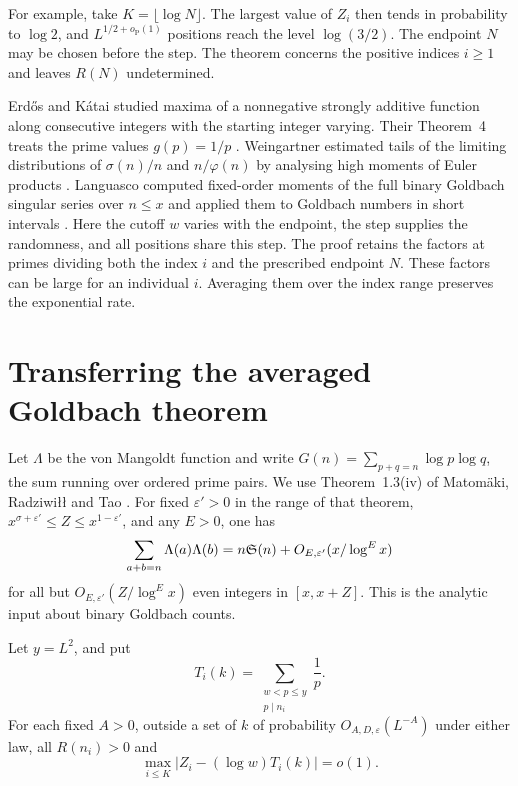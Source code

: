 For example, take \(K=\lfloor\log N\rfloor\). The largest value of
\(Z_i\) then tends in probability to \(\log 2\), and
\(L^{1/2+o_{\mathrm P}(1)}\) positions reach the level \(\log(3/2)\).
The endpoint \(N\) may be chosen before the step. The theorem concerns the
positive indices \(i\ge1\) and leaves \(R(N)\) undetermined.

Erd\H{o}s and K\'atai studied maxima of a nonnegative strongly additive
function along consecutive integers with the starting integer varying.
Their Theorem~4 treats the prime values \(g(p)=1/p\)
\cite{EK}. Weingartner estimated tails of the limiting distributions
of \(\sigma(n)/n\) and \(n/\varphi(n)\) by analysing high moments of
Euler products \cite{Wei}. Languasco computed fixed-order moments of
the full binary Goldbach singular series over \(n\le x\) and applied them
to Goldbach numbers in short intervals \cite{Lan}.
Here the cutoff \(w\) varies with the endpoint,
the step supplies the randomness, and all positions share this step. The
proof retains the factors at primes dividing both the index \(i\) and
the prescribed endpoint \(N\). These factors can be large for an
individual \(i\). Averaging them over the index range preserves the
exponential rate.

\section{Transferring the averaged Goldbach theorem}

Let \(\Lambda\) be the von Mangoldt function and write
\(G(n)=\sum_{p+q=n}\log p\log q\), the sum running over ordered prime
pairs. We use Theorem~1.3(iv) of Matom\"aki, Radziwi{\l}{\l} and Tao
\cite{MRT}. For fixed \(\varepsilon'>0\) in the range of that theorem,
\(x^{\sigma+\varepsilon'}\le Z\le x^{1-\varepsilon'}\), and any
\(E>0\), one has
\begin{equation}\label{eq:mrt}
  \sum_{a+b=n}\Lambda(a)\Lambda(b)
     = n\mathfrak S(n)+O_{E,\varepsilon'}(x/\log^E x)
\end{equation}
for all but \(O_{E,\varepsilon'}(Z/\log^E x)\) even integers in
\([x,x+Z]\). This is the analytic input about binary Goldbach counts.

\begin{lemma}\label{lem:transfer}
Let \(y=L^2\), and put
\[
        T_i(k)=\sum_{\substack{w<p\le y\\p\mid n_i}}\frac1p .
\]
For each fixed \(A>0\), outside a set of \(k\) of probability
\(O_{A,D,\varepsilon}(L^{-A})\) under either law, all \(R(n_i)>0\) and
\begin{equation}\label{eq:transfer}
        \max_{i\le K}|Z_i-(\log w)T_i(k)|=o(1).
\end{equation}
\end{lemma}

